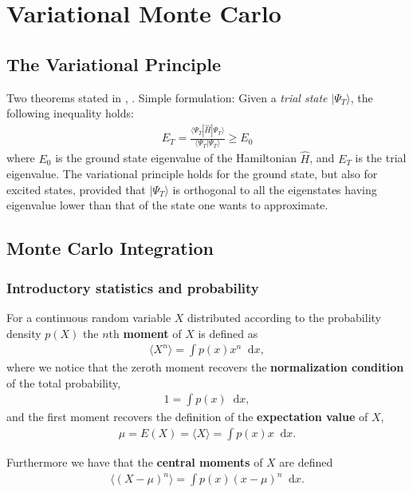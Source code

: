 \documentclass[twoside,english]{uiofysmaster}
\newcommand*\dif{\mathop{}\!\mathrm{d}}
\begin{document}
\section{Variational Monte Carlo}
\subsection{The Variational Principle}
Two theorems stated in \cite{Kvaal2017}, \cite{Helgaker2000}.
Simple formulation:
Given a \textit{trial state} $| \Psi_T \rangle$, the following inequality holds:
\begin{align}
	E_T = \frac{ \langle \Psi_T | \hat{H} | \Psi_T \rangle }{ \langle \Psi_T |\Psi_T \rangle } \geq E_0
\end{align}
where $E_0$ is the ground state eigenvalue of the Hamiltonian $\hat{H}$, and $E_T$ is the trial eigenvalue. The variational principle holds for the ground state, but also for excited states, provided that $|\Psi_T \rangle$ is orthogonal to all the eigenstates having eigenvalue lower than that of the state one wants to approximate.
\cite{HjortJensen2017}

\subsection{Monte Carlo Integration}
\subsubsection{Introductory statistics and probability}

For a continuous random variable $X$ distributed according to the probability density $p(X)$ the $n$th \textbf{moment} of $X$ is defined as
\begin{align}
	\langle X^n \rangle = \int p(x) x^n \dif x ,
\end{align}
where we notice that the zeroth moment recovers the \textbf{normalization condition} of the total probability,
\begin{align}
	1 = \int p(x) \dif x ,
\end{align}
and the first moment recovers the definition of the \textbf{expectation value} of $X$, 
\begin{align}
	\mu = E(X) = \langle X \rangle = \int p(x) x \dif x .
\end{align}


Furthermore we have that the \textbf{central moments} of $X$ are defined
\begin{align}
	\langle (X-\mu)^n \rangle = \int p(x) (x - \mu)^n \dif x .
\end{align}
\end{document}
